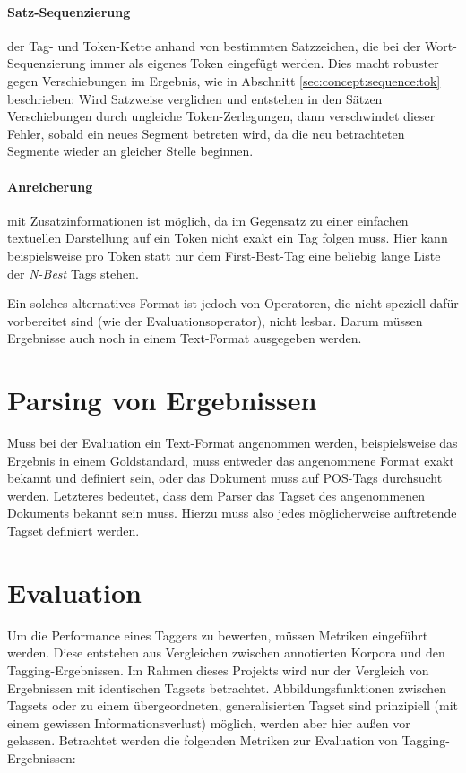 \paragraph{Satz-Sequenzierung} der Tag- und Token-Kette anhand von bestimmten Satzzeichen, die bei der Wort-Sequenzierung immer als eigenes Token eingefügt werden. Dies macht robuster gegen Verschiebungen im Ergebnis, wie in Abschnitt \ref{sec:concept:sequence:tok} beschrieben: Wird Satzweise verglichen und entstehen in den Sätzen Verschiebungen durch ungleiche Token-Zerlegungen, dann verschwindet dieser Fehler, sobald ein neues Segment betreten wird, da die neu betrachteten Segmente wieder an gleicher Stelle beginnen.
\paragraph{Anreicherung} mit Zusatzinformationen ist möglich, da im Gegensatz zu einer einfachen textuellen Darstellung auf ein Token nicht exakt ein Tag folgen muss. Hier kann beispielsweise pro Token statt nur dem First-Best-Tag eine beliebig lange Liste der \textit{N-Best} Tags stehen.

Ein solches alternatives Format ist jedoch von Operatoren, die nicht speziell dafür vorbereitet sind (wie der Evaluationsoperator), nicht lesbar. Darum müssen Ergebnisse auch noch in einem Text-Format ausgegeben werden.

\section{Parsing von Ergebnissen}
Muss bei der Evaluation ein Text-Format angenommen werden, beispielsweise das Ergebnis in einem Goldstandard, muss entweder das angenommene Format exakt bekannt und definiert sein, oder das Dokument muss auf POS-Tags durchsucht werden. Letzteres bedeutet, dass dem Parser das Tagset des angenommenen Dokuments bekannt sein muss. Hierzu muss also jedes möglicherweise auftretende Tagset definiert werden.

\section{Evaluation}
\label{sec:concept:eval}
Um die Performance eines Taggers zu bewerten, müssen Metriken eingeführt werden. Diese entstehen aus Vergleichen zwischen annotierten Korpora und den Tagging-Ergebnissen. Im Rahmen dieses Projekts wird nur der Vergleich von Ergebnissen mit identischen Tagsets betrachtet. Abbildungsfunktionen zwischen Tagsets oder zu einem übergeordneten, generalisierten Tagset sind prinzipiell (mit einem gewissen Informationsverlust) möglich, werden aber hier außen vor gelassen. Betrachtet werden die folgenden Metriken zur Evaluation von Tagging-Ergebnissen:



